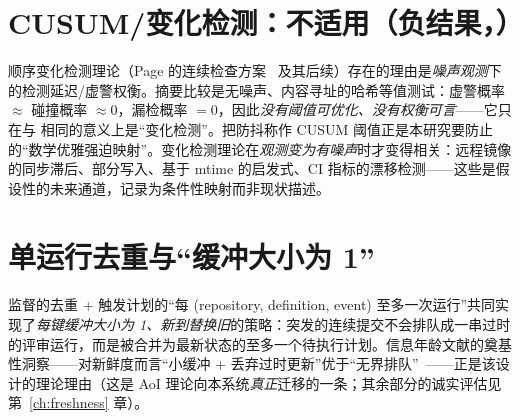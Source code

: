 \section{CUSUM/变化检测：不适用（负结果，\NA）}

顺序变化检测理论（Page 的连续检查方案~\cite{page1954} 及其后续）存在的理由是\emph{噪声观测}下的检测延迟/虚警权衡。摘要比较是无噪声、内容寻址的哈希等值测试：虚警概率 $\approx$ 碰撞概率 $\approx 0$，漏检概率 $=0$，因此\emph{没有阈值可优化、没有权衡可言}——它只在与  相同的意义上是“变化检测”。把防抖称作 CUSUM 阈值正是本研究要防止的“数学优雅强迫映射”。变化检测理论在\emph{观测变为有噪声}时才变得相关：远程镜像的同步滞后、部分写入、基于 mtime 的启发式、CI 指标的漂移检测——这些是假设性的未来通道，记录为条件性映射而非现状描述。

\section{单运行去重与“缓冲大小为 1”}

监督的去重 + 触发计划的“每 (repository, definition, event) 至多一次运行”共同实现了\emph{每键缓冲大小为 1、新到替换旧}的策略：突发的连续提交不会排队成一串过时的评审运行，而是被合并为最新状态的至多一个待执行计划。信息年龄文献的奠基性洞察——对新鲜度而言“小缓冲 + 丢弃过时更新”优于“无界排队”~\cite{kaul2012}——正是该设计的理论理由（这是 AoI 理论向本系统\emph{真正}迁移的一条；其余部分的诚实评估见第~\ref{ch:freshness} 章）。
